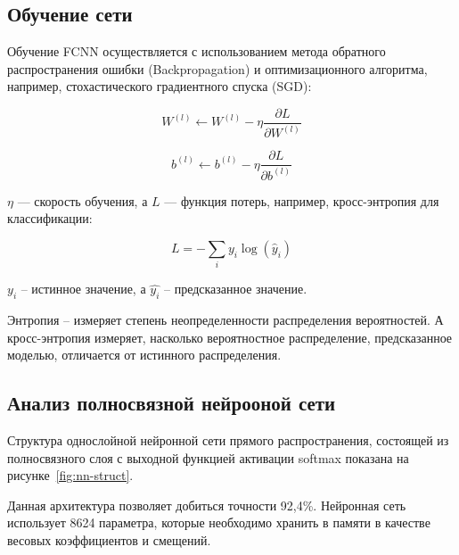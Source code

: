 \subsection{Обучение сети}
\hspace*{12.5 mm}Обучение FCNN осуществляется с использованием метода обратного 
распространения ошибки (Backpropagation) и оптимизационного алгоритма, 
например, стохастического градиентного спуска (SGD):

\begin{equation}
    W^{(l)} \leftarrow W^{(l)} - \eta \frac{\partial L}{\partial W^{(l)}}
\end{equation}

\begin{equation}
    b^{(l)} \leftarrow b^{(l)} - \eta \frac{\partial L}{\partial b^{(l)}}
\end{equation}

 $\eta$ — скорость обучения, а $L$ — функция потерь, например, 
кросс-энтропия для классификации:

\begin{equation}
    L = - \sum_{i} y_i \log(\hat{y}_i)
\end{equation}

 \( y_i \) – истинное значение, а \( \hat{y_i} \) – предсказанное 
значение.

Энтропия – измеряет степень неопределенности распределения вероятностей. А 
кросс-энтропия измеряет, насколько вероятностное распределение, предсказанное 
моделью, отличается от истинного распределения.

\subsection{Анализ полносвязной нейрооной сети}
\hspace*{12.5 mm}Структура однослойной нейронной сети прямого распространения, 
состоящей из полносвязного слоя с выходной функцией активации softmax показана 
на рисунке~\ref{fig:nn-struct}.


Данная архитектура позволяет добиться точности 92,4\%\cite{Doc}. Нейронная сеть 
использует 8624 параметра, которые необходимо хранить в памяти в качестве 
весовых коэффициентов и смещений.

